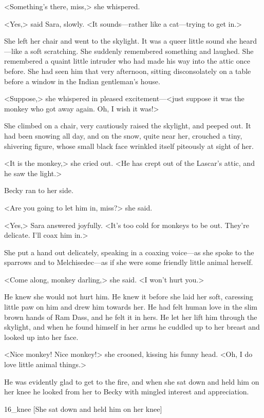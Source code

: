 <Something's there, miss,> she whispered.

<Yes,> said Sara, slowly. <It sounds—rather like a cat—trying to get in.>

She left her chair and went to the skylight. It was a queer little sound she heard—like a soft scratching. She suddenly remembered something and laughed. She remembered a quaint little intruder who had made his way into the attic once before. She had seen him that very afternoon, sitting disconsolately on a table before a window in the Indian gentleman's house.

<Suppose,> she whispered in pleased excitement—<just suppose it was the monkey who got away again. Oh, I wish it was!>

She climbed on a chair, very cautiously raised the skylight, and peeped out. It had been snowing all day, and on the snow, quite near her, crouched a tiny, shivering figure, whose small black face wrinkled itself piteously at sight of her.

<It is the monkey,> she cried out. <He has crept out of the Lascar's attic, and he saw the light.>

Becky ran to her side.

<Are you going to let him in, miss?> she said.

<Yes,> Sara answered joyfully. <It's too cold for monkeys to be out. They're delicate. I'll coax him in.>

She put a hand out delicately, speaking in a coaxing voice—as she spoke to the sparrows and to Melchisedec—as if she were some friendly little animal herself.

<Come along, monkey darling,> she said. <I won't hurt you.>

He knew she would not hurt him. He knew it before she laid her soft, caressing little paw on him and drew him towards her. He had felt human love in the slim brown hands of Ram Dass, and he felt it in hers. He let her lift him through the skylight, and when he found himself in her arms he cuddled up to her breast and looked up into her face.

<Nice monkey! Nice monkey!> she crooned, kissing his funny head. <Oh, I do love little animal things.>

He was evidently glad to get to the fire, and when she sat down and held him on her knee he looked from her to Becky with mingled interest and appreciation.

\begin{colorbigpic}
	[\basicscale]
	{16_knee}
	[She sat down and held him on her knee]
\end{colorbigpic}

